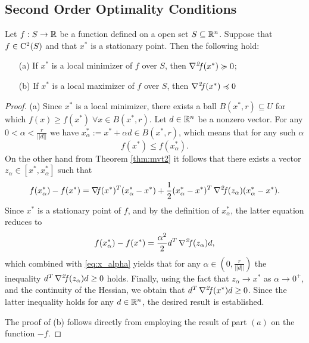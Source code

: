 \documentclass[10pt,a4paper]{article}
\begin{document}
\subsection{Second Order Optimality Conditions}
\begin{theorem}\label{thm:second_order_optimality}
	Let $f:S\to \mathbb{R}$ be a function defined on a open set $S\subseteq \mathbb{R}^n$. Suppose that $f\in\mathord{\mathrm{C^2}}(S)$ and that $x^*$ is a stationary point. Then the following hold:
\begin{itemize}
	\item[(a)] If $x^*$ is a local minimizer of $f$ over $S$, then $\operatorname*{\mathit{\nabla^2 \!f}} (x^*)\succcurlyeq 0$;
	\item[(b)] If $x^*$ is a local maximizer of $f$ over $S$, then $\operatorname*{\mathit{\nabla^2 \!f}} (x^*)\preccurlyeq 0$ 	
\end{itemize}
\end{theorem}
\begin{proof}
	(a) Since $x^*$ is a local minimizer, there exists a ball $B(x^*,r)\subseteq U$ for which $f(x) \geq f(x^*)\; \forall x\in B(x^*,r)$. Let $d\in \mathbb{R}^n$ be a nonzero vector. For any $0<\alpha<\frac{r}{||d||}$ we have $x_\alpha^* :=x^* + \alpha d \in B(x^*, r)$, which means that for any such $\alpha$
	\begin{equation}\label{eq:x_alpha}
		f(x^*)\leq f(x_\alpha^*).
	\end{equation}
On the other hand from Theorem \ref{thm:mvt2} it follows that there exists a vector $z_\alpha \in [x^*,x_\alpha^*]$ such that 
\begin{equation*}
	f(x_\alpha^*)- f(x^*) =\operatorname*{\mathit{\nabla \!f}} (x^*)^T(x_\alpha^*-x^*) +\frac{1}{2}(x_\alpha^*-x^*)^T\operatorname*{\mathit{\nabla^2 \!f}}(z_\alpha)(x_\alpha^*-x^*).
\end{equation*}
Since $x^*$ is a stationary point of $f$, and by the definition of $x_\alpha^*$, the latter equation reduces to 
\begin{equation*}
	f(x_\alpha^*)- f(x^*) = \frac{\alpha^2}{2} d^T\operatorname*{\mathit{\nabla^2 \!f}}(z_\alpha) d,
\end{equation*}
which combined with \eqref{eq:x_alpha} yields that for any $\alpha \in (0, \frac{r}{||d||})$ the inequality $d^T \operatorname*{\mathit{\nabla^2 \!f}}(z_\alpha) d\geq 0$ holds. Finally, using the fact that $z_\alpha \to x^*$ as $\alpha\to 0^+$, and the continuity of the Hessian, we obtain that $d^T \operatorname*{\mathit{\nabla^2 \!f}}(x^*) d\geq 0$. Since the latter inequality holds for any $d \in\mathbb{R}^n$, the desired result is established. 
\par The proof of (b) follows directly from employing the result of part $(a)$ on the function $-f$.
\end{proof}
\end{document}
